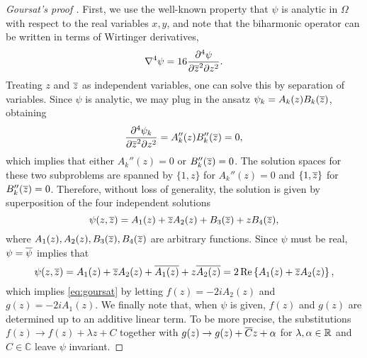 \begin{proof}[Goursat's proof \cite{Gou98}]
First, we use the well-known property that $\psi$ is analytic in $\Omega$ with respect to the real variables $x,y$, and note that the biharmonic operator can be written in terms of Wirtinger derivatives,
\begin{equation}
\nabla^4 \psi = 16\frac{\partial^4 \psi}{\partial{\overline{z}}^2 \partial z^2}.
\end{equation}
Treating $z$ and ${\overline{z}}$ as independent variables, one can solve this by separation of variables. Since $\psi$ is analytic, we may plug in the ansatz $\psi_k = A_k(z)B_k({\overline{z}})$, obtaining
\begin{equation}
\frac{\partial^4 \psi_k}{\partial{\overline{z}}^2 \partial z^2} = A_k''(z) B_k''({\overline{z}}) = 0,
\end{equation} 
which implies that either $A_k''(z)=0$ or $B_k''({\overline{z}})=0$. The solution spaces for these two subproblems are spanned by $\{1,z\}$ for $A_k''(z)=0$  and $\{1,{\overline{z}}\}$ for $B_k''({\overline{z}})=0$. Therefore, without loss of generality, the solution is given by superposition of the four independent solutions
\begin{equation}
\psi(z,{\overline{z}}) =  A_1(z) + {\overline{z}} A_2(z) + B_3({\overline{z}}) + z B_4({\overline{z}}),
\end{equation}
where $A_1(z), A_2(z), B_3({\overline{z}}), B_4({\overline{z}})$ are arbitrary functions. Since $\psi$ must be real, $\psi={\overline{\psi}}$ implies that 
\begin{equation}
\psi(z,{\overline{z}}) =  A_1(z)  + {\overline{z}} A_2(z)  + {\overline{A_1(z)}} + z {\overline{A_2(z)}} = 2 \Re\left\{A_1(z) + {\overline{z}} A_2(z)\right\},
\end{equation}
which implies \eqref{eq:goursat} by letting $f(z) = -2i A_2(z)$ and $g(z) = -2i A_1(z)$. We finally note that, when $\psi$ is given, $f(z)$ and $g(z)$ are determined up to an additive linear term. To be more precise, the substitutions $f(z)\to f(z)+\lambda z + C$ together with $g(z)\to g(z)+{\overline{C}}z+\alpha$ for $\lambda,\alpha\in\mathbb{R}$ and $C\in\mathbb{C}$ leave $\psi$ invariant.
\end{proof}


